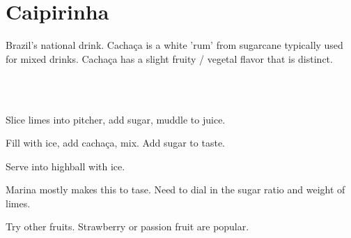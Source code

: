\section[Caipirinha]{Caipirinha~\vegan}


\begin{recipestats}[
	servings=4,
	preptime=10 \minute,
	source=Kevin \& Marina,
]
\end{recipestats}


\begin{recipeabstract}
	Brazil's national drink.
	Cacha\c{c}a is a white 'rum' from sugarcane typically used for mixed drinks.
	Cacha\c{c}a has a slight fruity / vegetal flavor that is distinct.
\end{recipeabstract}


\begin{ingredientcolumns}[1]
	\begin{ingredientblock}
		\\
		\\
	\end{ingredientblock}
\end{ingredientcolumns}


\begin{preparation}
\item Slice limes into pitcher, add sugar, muddle to juice.

\item Fill with ice, add cacha\c{c}a, mix.
	Add sugar to taste.

\item Serve into highball with ice.
\end{preparation}


\begin{experiments}
\item Marina mostly makes this to tase.
	Need to dial in the sugar ratio and weight of limes.
\end{experiments}


\begin{variation}
\item Try other fruits.
	Strawberry or passion fruit are popular.
\end{variation}


\recipeend
